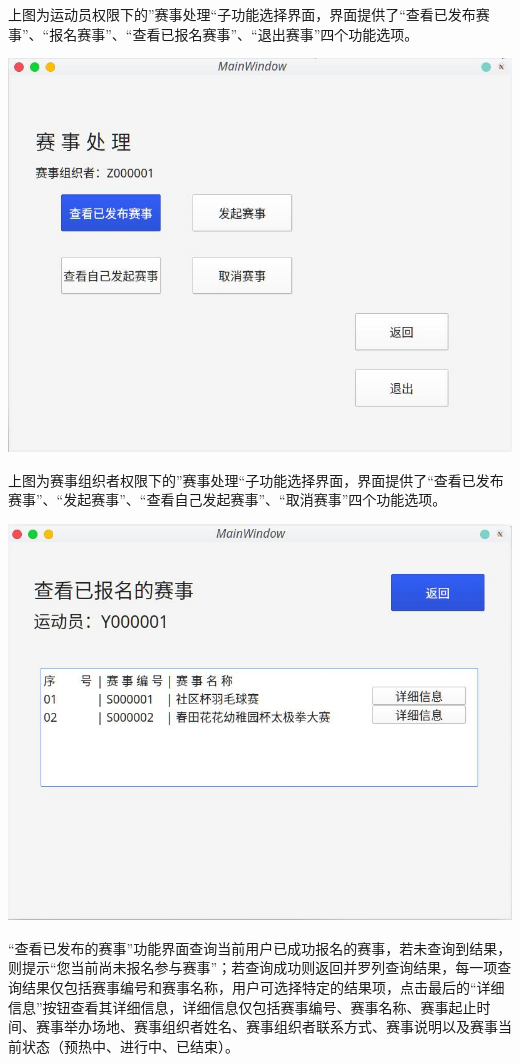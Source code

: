 \documentclass[a4paper,UTF8]{article}
\begin{document}
上图为运动员权限下的”赛事处理“子功能选择界面，界面提供了“查看已发布赛事”、“报名赛事”、“查看已报名赛事”、“退出赛事”四个功能选项。

{\centering\includegraphics[width=1\columnwidth]{10.png}
	
}

上图为赛事组织者权限下的”赛事处理“子功能选择界面，界面提供了“查看已发布赛事”、“发起赛事”、“查看自己发起赛事”、“取消赛事”四个功能选项。

{\centering\includegraphics[width=1\columnwidth]{11.png}
	
}

“查看已发布的赛事”功能界面查询当前用户已成功报名的赛事，若未查询到结果，则提示“您当前尚未报名参与赛事”；若查询成功则返回并罗列查询结果，每一项查询结果仅包括赛事编号和赛事名称，用户可选择特定的结果项，点击最后的“详细信息”按钮查看其详细信息，详细信息仅包括赛事编号、赛事名称、赛事起止时间、赛事举办场地、赛事组织者姓名、赛事组织者联系方式、赛事说明以及赛事当前状态（预热中、进行中、已结束）。
\end{document}
